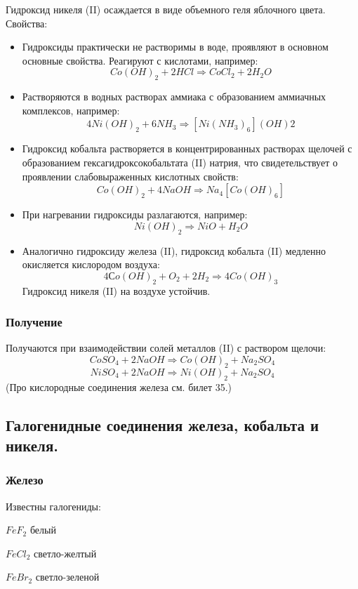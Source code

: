 \documentclass[11pt]{article}
\begin{document}
Гидроксид никеля (II) осаждается в виде объемного геля яблочного цвета.
Свойства:
\begin{itemize}
\item Гидроксиды практически не растворимы в воде, проявляют в основном
основные свойства. Реагируют с кислотами, например:
$$Co(OH) _2  + 2HCl \Rightarrow CoCl _2  + 2H _2 O$$

\item  Растворяются в водных растворах аммиака с образованием аммиачных
комплексов, например:
$$4Ni(OH) _2  + 6NH _3  \Rightarrow [Ni(NH _3 ) _6 ](OH) 2$$

\item Гидроксид кобальта растворяется в концентрированных растворах
щелочей с образованием гексагидроксокобальтата (II) натрия, что
свидетельствует о проявлении слабовыраженных кислотных свойств:
$$Co(OH) _2  + 4NaOH \Rightarrow Na _4 [Co(OH) _6 ]$$

\item При нагревании гидроксиды разлагаются, например:
$$Ni(OH) _2  \Rightarrow NiO + H _2 O$$

\item Аналогично гидроксиду железа (II), гидроксид кобальта (II) медленно
окисляется кислородом воздуха:
$$4Сo(OH) _2  + O _2  + 2H _2 \Rightarrow 4Co(OH) _3$$
Гидроксид никеля (II) на воздухе устойчив.

\end{itemize}
\subsubsection{Получение}

Получаются при взаимодействии солей металлов (II) с раствором щелочи:
$$CoSO _4  + 2NaOH \Rightarrow Co(OH) _2  + Na _2 SO _4  $$
$$NiSO _4  + 2NaOH \Rightarrow Ni(OH) _2  + Na _2 SO _4  $$
(Про кислородные соединения железа см. билет 35.)

\subsection{Галогенидные соединения железа, кобальта и никеля.}
\subsubsection{Железо}
Известны галогениды:

$FeF_2$ белый

$FeCl_2$ светло-желтый

$FeBr_2$ светло-зеленой
\end{document}
